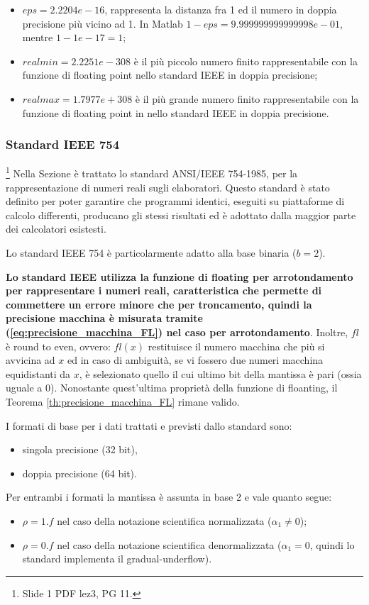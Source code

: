 \begin{itemize}
	\item $eps =  2.2204e-16$, rappresenta la distanza fra 1 ed il numero in doppia precisione più vicino ad 1. In Matlab $1 - eps = 9.999999999999998e-01$, mentre $1 - 1e-17 = 1$;
	\item $realmin = 2.2251e-308$ è il più piccolo numero finito rappresentabile con la funzione di floating point nello standard IEEE in doppia precisione;
	\item $realmax = 1.7977e+308$ è il più grande numero finito rappresentabile con la funzione di floating point in nello standard IEEE in doppia precisione.
\end{itemize}

\subsubsection{Standard IEEE 754}\footnote{Slide 1 PDF lez3, PG 11.}
Nella Sezione è trattato lo standard ANSI/IEEE 754-1985, per la rappresentazione di numeri reali sugli elaboratori. Questo standard è stato definito per poter garantire che programmi identici, eseguiti su piattaforme di calcolo differenti, producano gli stessi risultati ed è adottato dalla maggior parte dei calcolatori esistesti. 

Lo standard IEEE 754 è particolarmente adatto alla base binaria ($b=2$).

\textbf{Lo standard IEEE utilizza la funzione di floating per arrotondamento per rappresentare i numeri reali, caratteristica che permette di commettere un errore minore che per troncamento, quindi la precisione macchina è misurata tramite (\ref{eq:precisione_macchina_FL}) nel caso per arrotondamento}. Inoltre, $fl$ è round to even, ovvero: $fl(x)$ restituisce il numero macchina che più si avvicina ad $x$ ed in caso di ambiguità, se vi fossero due numeri macchina equidistanti da $x$, è selezionato quello il cui ultimo bit della mantissa è pari (ossia uguale a 0). Nonostante quest'ultima proprietà della funzione di floanting, il Teorema \ref{th:precisione_macchina_FL} rimane valido. 

I formati di base per i dati trattati e previsti dallo standard sono:
\begin{itemize}
	\item singola precisione (32 bit),
	\item doppia precisione (64 bit).
\end{itemize}

Per entrambi i formati la mantissa è assunta in base 2 e vale quanto segue:
\begin{itemize}
	\item $\rho=1.f$ nel caso della notazione scientifica normalizzata ($\alpha_1\neq 0$);
	\item $\rho=0.f$ nel caso della notazione scientifica denormalizzata ($\alpha_1=0$, quindi lo standard implementa il gradual-underflow).
\end{itemize}

